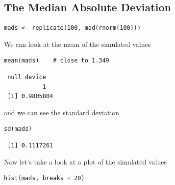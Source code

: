 \documentclass[captions=tableheading]{scrbook}
\begin{document}
\subsection{The Median Absolute Deviation}
\label{sec-8-5-2}



\begin{verbatim}
mads <- replicate(100, mad(rnorm(100)))
\end{verbatim}

We can look at the mean of the simulated values


\begin{verbatim}
mean(mads)    # close to 1.349
\end{verbatim}

\begin{verbatim}
 null device 
           1
 [1] 0.9805804
\end{verbatim}

and we can see the standard deviation


\begin{verbatim}
sd(mads)
\end{verbatim}

\begin{verbatim}
 [1] 0.1117261
\end{verbatim}

Now let's take a look at a plot of the simulated values


\begin{verbatim}
hist(mads, breaks = 20)
\end{verbatim}
\end{document}
